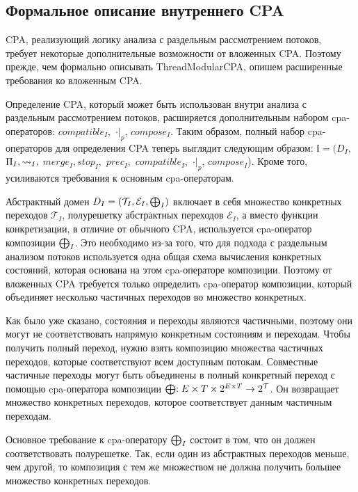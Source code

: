 \subsection{Формальное описание внутреннего CPA}
 
CPA, реализующий логику анализа с раздельным рассмотрением потоков, требует некоторые дополнительные возможности от вложенных CPA. 
Поэтому прежде, чем формально описывать ThreadModularCPA, опишем расширенные требования ко вложенным CPA.
 
Определение CPA, который может быть использован внутри анализа с раздельным рассмотрением потоков, расширяется дополнительным набором cpa-операторов: $compatible_{I},$ $\cdot|_p$, $compose_I$.
Таким образом, полный набор cpa-операторов для определения CPA теперь выглядит следующим образом: $\mathbb{I}=(D_{I},$ $\Pi_{I}, \leadsto_{I},$ $merge_{I}, stop_{I},$ $prec_{I},$ $compatible_{I},$ $\cdot|_p$, $compose_I$).
Кроме того, усиливаются требования к основным cpa-операторам.

Абстрактный домен $D_I = (\mathcal{T}_I, \mathcal{E}_I, \mathrel{\bigoplus}_I)$ включает в себя множество конкретных переходов $\mathcal{T}_I$, полурешетку абстрактных переходов $\mathcal{E}_I$, а вместо функции конкретизации, в отличие от обычного CPA, используется cpa-оператор композиции $\mathrel{\bigoplus}_I$.
Это необходимо из-за того, что для подхода с раздельным анализом потоков используется одна общая схема вычисления конкретных состояний, которая основана на этом cpa-операторе композиции. 
Поэтому от вложенных CPA требуется только определить cpa-оператор композиции, который объединяет несколько частичных переходов во множество конкретных.

Как было уже сказано, состояния и переходы являются частичными, поэтому они могут не соответствовать напрямую конкретным состояниям и переходам. Чтобы получить полный переход, нужно взять композицию множества частичных переходов, которые соответствуют всем доступным потокам. Совместные частичные переходы могут быть объединены в полный конкретный переход с помощью cpa-оператора композиции $\mathrel{\bigoplus}: E \times T \times 2^{E \times T} \to 2^{\mathcal{T}}$.
Он возвращает множество конкретных переходов, которое соответствует данным частичным переходам.

Основное требование к cpa-оператору $\mathrel{\bigoplus}_I$ состоит в том, что он должен соответствовать полурешетке. Так, если один из абстрактных переходов меньше, чем другой, то композиция с тем же множеством не должна получить большее множество конкретных переходов. 


